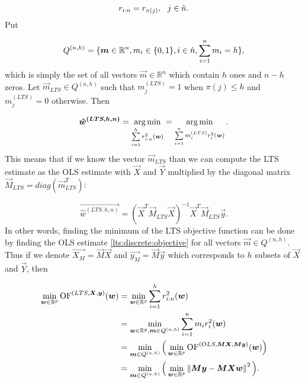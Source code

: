 \begin{equation}
    r_{i:n} = r_{\pi(j)}\\, \ \ j \in \hat{n}.
\end{equation}
Put

 \begin{equation}
   Q^{(n,h)} = \{{\vec{m} \in \mathbb{R}^n \\, m_i \in \{{0, 1\}} \\,i \in \hat{n} \\,   \sum\limits_{i=1}^n  m_i = h \}},
\end{equation}
which is simply the set of all vectors $\vec{m} \in \mathbb{R}^n$ which contain $h$ ones and $n-h$ zeros. Let $\vec{m}_{LTS} \in Q^{(n,h)}$  such that  $m^{(LTS)}_j = 1$ when $\pi(j) \leq h$ and $m^{(LTS)}_j = 0$ otherwise. Then

\begin{equation} \label{ltshat}
    \vec{\hat{w}^{(LTS, h, n)}} =  
  \argmin_{ \sum\limits_{i=1}^h r_{i:n}^2(\vec{w}) } = 
  \argmin_{ \sum\limits_{i=1}^n m^{(LTS)}_i r_{i}^2(\vec{w}) }. 
\end{equation}
This means that if we know the vector $\vec{m}_{LTS}$ than we can compute the LTS estimate as the OLS estimate with $\vec{X}$ and $\vec{Y}$ multiplied by the diagonal matrix $\vec{M}_{LTS} = diag(\vec{m}^T_{LTS})$:

\begin{equation}  \label{lts:discrete:objective}
    \vec{\hat{w}^{(LTS, h, n)}} = (\vec{X}^T\vec{M}_{LTS}\vec{X})^{-1}\vec{X}^T\vec{M}_{LTS}\vec{y}.
\end{equation}
In other words, finding the minimum of the LTS objective function can be done by finding the OLS estimate \eqref{lts:discrete:objective} for all vectors 
$\vec{m} \in Q^{(n,h)}$. 
Thus if we denote $\vec{X_{M}} = \vec{M}\vec{X} $ and $\vec{y_{M}} = \vec{M}\vec{y}$ which corresponds to $h$ subsets  of $\vec{X}$ and $\vec{Y}$, then \cite{kloudaVyzkumnyUkol}





\begin{align*} 
\minim_{\vec{w} \in \mathbb{R}^p} 
    \of^{(LTS,\vec{X}, \vec{y})}(\vec{w})  
&=\minim_{\vec{w} \in \mathbb{R}^p} 
    \sum\limits_{i=1}^h r_{i:n}^2(\vec{w})  \\
&= \minim_{\vec{w} \in \mathbb{R}^p,\vec{m} \in Q^{(n,h)}} 
        \sum\limits_{i=1}^n m_i r_{i}^2(\vec{w})\\
&= \minim_{\vec{m} \in Q^{(n,h)}} 
            \Big( \minim_{\vec{w} \in\mathbb{R}^p} 
            \of^{(OLS,\vec{M}\vec{X},  \vec{M}\vec{y} )} (\vec{w}) \Big)\\
&= \minim_{\vec{m} \in Q^{(n,h)}} 
            \Big(\minim_{\vec{w} \in\mathbb{R}^p}  
            \norm{ \vec{M}\vec{y} -   \vec{M}\vec{X}\vec{w}  }^2 \Big).
\end{align*}

